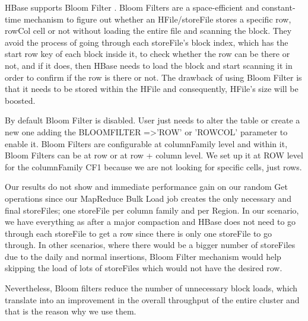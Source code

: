 \begin{itemize}
HBase supports Bloom Filter \cite{bloom1970space}. Bloom Filters are a space-efficient and constant-time mechanism to figure out whether an HFile/storeFile stores a specific row, rowCol cell or not without loading the entire file and scanning the block. They avoid the process of going through each storeFile's block index, which has the start row key of each block inside it, to check whether the row can be there or not, and if it does, then HBase needs to load the block and start scanning it in order to confirm if the row is there or not. The drawback of using Bloom Filter is that it needs to be stored within the HFile and consequently, HFile's size will be boosted. 
\par
By default Bloom Filter is disabled. User just needs to alter the table or create a new one adding the BLOOMFILTER =\textgreater 'ROW' or 'ROWCOL' parameter to enable it. Bloom Filters are configurable at columnFamily level and within it, Bloom Filters can be at row or at row + column level. We set up it at ROW level for the columnFamily CF1 because we are not looking for specific cells, just rows.

\bigskip

Our results do not show and immediate performance gain on our random Get operations since our MapReduce Bulk Load job creates the only necessary and final storeFiles; one storeFile per column family and per Region. In our scenario, we have everything as after a major compaction and HBase does not need to go through each storeFile to get a row since there is only one storeFile to go through. In other scenarios, where there would be a bigger number of storeFiles due to the daily and normal insertions, Bloom Filter mechanism would help skipping the load of lots of storeFiles which would not have the desired row.
\par
Nevertheless, Bloom filters reduce the number of unnecessary block loads, which translate into an improvement in the overall throughput of the entire cluster and that is the reason why we use them.

\end{itemize}












